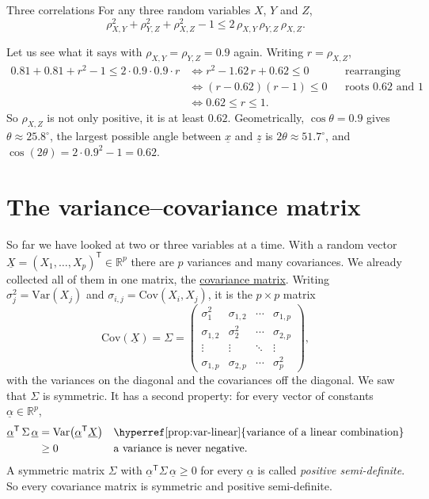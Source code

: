 \documentclass[a4paper,12pt,oneside]{report}
\begin{document}
\begin{framedprop}{Three correlations}\label{prop:three-correlations}
For any three random variables $X$, $Y$ and $Z$,
\[
\rho_{X,Y}^2+\rho_{Y,Z}^2+\rho_{X,Z}^2-1\leq2\,\rho_{X,Y}\,\rho_{Y,Z}\,\rho_{X,Z} .
\]
\end{framedprop}

Let us see what it says with $\rho_{X,Y}=\rho_{Y,Z}=0.9$ again. Writing
$r=\rho_{X,Z}$,
\begin{align*}
0.81+0.81+r^2-1\leq2\cdot0.9\cdot0.9\cdot r
&\iff r^2-1.62\,r+0.62\leq0
&&\text{rearranging}\\
&\iff(r-0.62)(r-1)\leq0
&&\text{roots $0.62$ and $1$}\\
&\iff0.62\leq r\leq1 .
\end{align*}
So $\rho_{X,Z}$ is not only positive, it is at least $0.62$. Geometrically,
$\cos\theta=0.9$ gives $\theta\approx25.8^\circ$, the largest possible
angle between $\underline{x}$ and $\underline{z}$ is
$2\theta\approx51.7^\circ$, and $\cos(2\theta)=2\cdot0.9^2-1=0.62$.

\section{The variance--covariance matrix}\label{sec:var-cov-matrix}

So far we have looked at two or three variables at a time. With a random
vector $\underline{X}=(X_1,\ldots,X_p)^{\mathsf T}\in\mathbb{R}^p$ there are
$p$ variances and many covariances. We already collected all of them in one
matrix, the \hyperref[def:covariance]{covariance matrix}. Writing
$\sigma_j^2=\mathrm{Var}(X_j)$ and $\sigma_{i,j}=\mathrm{Cov}(X_i,X_j)$, it
is the $p\times p$ matrix
\[
\mathrm{Cov}(\underline{X})=\Sigma=
\begin{pmatrix}
\sigma_1^2&\sigma_{1,2}&\cdots&\sigma_{1,p}\\
\sigma_{1,2}&\sigma_2^2&\cdots&\sigma_{2,p}\\
\vdots&\vdots&\ddots&\vdots\\
\sigma_{1,p}&\sigma_{2,p}&\cdots&\sigma_p^2
\end{pmatrix},
\]
with the variances on the diagonal and the covariances off the diagonal.
We saw that $\Sigma$ is symmetric. It has a second property: for every
vector of constants $\underline{\alpha}\in\mathbb{R}^p$,
\begin{align*}
\underline{\alpha}^{\mathsf T}\,\Sigma\,\underline{\alpha}
&=\mathrm{Var}\big(\underline{\alpha}^{\mathsf T}\underline{X}\big)
&&\text{\hyperref[prop:var-linear]{variance of a linear combination}}\\
&\geq0
&&\text{a variance is never negative.}
\end{align*}
A symmetric matrix $\Sigma$ with
$\underline{\alpha}^{\mathsf T}\Sigma\,\underline{\alpha}\geq0$ for every
$\underline{\alpha}$ is called \emph{positive semi-definite}. So every
covariance matrix is symmetric and positive semi-definite.
\end{document}
